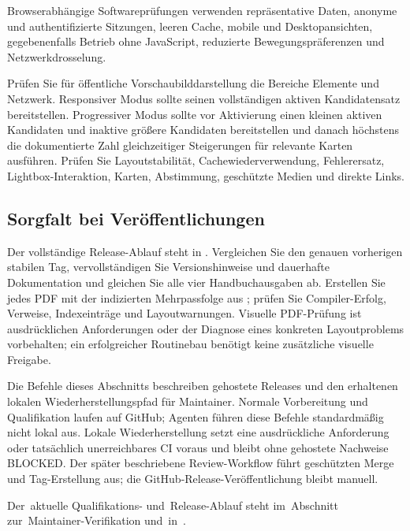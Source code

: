 \documentclass[11pt,a4paper]{article}
\newcommand{\filepath}[1]{\path{#1}}
\begin{document}
Browserabhängige Softwareprüfungen verwenden repräsentative Daten, anonyme und
authentifizierte Sitzungen, leeren Cache, mobile und Desktopansichten,
gegebenenfalls Betrieb ohne JavaScript, reduzierte Bewegungspräferenzen und
Netzwerkdrosselung.

Prüfen Sie für öffentliche Vorschaubilddarstellung die Bereiche Elemente und
Netzwerk. Responsiver Modus sollte seinen vollständigen aktiven Kandidatensatz
bereitstellen. Progressiver Modus sollte vor Aktivierung einen kleinen aktiven
Kandidaten und inaktive größere Kandidaten bereitstellen und danach höchstens
die dokumentierte Zahl gleichzeitiger Steigerungen für relevante Karten
ausführen. Prüfen Sie Layoutstabilität, Cachewiederverwendung, Fehlerersatz,
Lightbox-Interaktion, Karten, Abstimmung, geschützte Medien und direkte Links.

\subsection{Sorgfalt bei Veröffentlichungen}

Der vollständige Release-Ablauf steht in \filepath{RELEASE.md}. Vergleichen Sie
den genauen vorherigen stabilen Tag, vervollständigen Sie Versionshinweise und
dauerhafte Dokumentation und gleichen Sie alle vier Handbuchausgaben ab.
Erstellen Sie jedes PDF mit der indizierten Mehrpassfolge aus
\filepath{docs/LATEX_BUILD.md}; prüfen Sie Compiler-Erfolg, Verweise,
Indexeinträge und Layoutwarnungen. Visuelle PDF-Prüfung ist ausdrücklichen
Anforderungen oder der Diagnose eines konkreten Layoutproblems vorbehalten; ein
erfolgreicher Routinebau benötigt keine zusätzliche visuelle Freigabe.

Die Befehle dieses Abschnitts beschreiben gehostete Releases und den erhaltenen
lokalen Wiederherstellungspfad für Maintainer. Normale Vorbereitung und
Qualifikation laufen auf GitHub; Agenten führen diese Befehle standardmäßig
nicht lokal aus. Lokale Wiederherstellung setzt eine ausdrückliche Anforderung
oder tatsächlich unerreichbares CI voraus und bleibt ohne gehostete Nachweise
BLOCKED. Der später beschriebene Review-Workflow führt geschützten Merge und
Tag-Erstellung aus; die GitHub-Release-Veröffentlichung bleibt manuell.

Der~aktuelle Qualifikations- und~Release-Ablauf steht im~Abschnitt
zur~Maintainer-Verifikation und~in~\filepath{RELEASE.md}.
\end{document}
